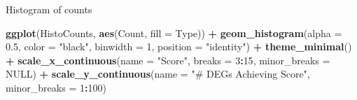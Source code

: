 \documentclass[
]{article}
\newenvironment{Shaded}{\begin{snugshade}}{\end{snugshade}}
\newcommand{\CommentTok}[1]{\textcolor[rgb]{0.56,0.35,0.01}{\textit{#1}}}
\newcommand{\DataTypeTok}[1]{\textcolor[rgb]{0.13,0.29,0.53}{#1}}
\newcommand{\DecValTok}[1]{\textcolor[rgb]{0.00,0.00,0.81}{#1}}
\newcommand{\FloatTok}[1]{\textcolor[rgb]{0.00,0.00,0.81}{#1}}
\newcommand{\KeywordTok}[1]{\textcolor[rgb]{0.13,0.29,0.53}{\textbf{#1}}}
\newcommand{\NormalTok}[1]{#1}
\newcommand{\OperatorTok}[1]{\textcolor[rgb]{0.81,0.36,0.00}{\textbf{#1}}}
\newcommand{\OtherTok}[1]{\textcolor[rgb]{0.56,0.35,0.01}{#1}}
\newcommand{\StringTok}[1]{\textcolor[rgb]{0.31,0.60,0.02}{#1}}
\begin{document}
\begin{Shaded}
\end{Shaded}

Histogram of counts

\begin{Shaded}
\begin{Highlighting}[]
\KeywordTok{ggplot}\NormalTok{(HistoCounts, }\KeywordTok{aes}\NormalTok{(Count, }\DataTypeTok{fill =}\NormalTok{ Type)) }\OperatorTok{+}
\StringTok{  }\KeywordTok{geom_histogram}\NormalTok{(}\DataTypeTok{alpha =} \FloatTok{0.5}\NormalTok{, }\DataTypeTok{color =} \StringTok{"black"}\NormalTok{, }\DataTypeTok{binwidth =} \DecValTok{1}\NormalTok{, }\DataTypeTok{position =} \StringTok{"identity"}\NormalTok{) }\OperatorTok{+}
\StringTok{  }\KeywordTok{theme_minimal}\NormalTok{() }\OperatorTok{+}
\StringTok{  }\KeywordTok{scale_x_continuous}\NormalTok{(}\DataTypeTok{name =} \StringTok{"Score"}\NormalTok{, }\DataTypeTok{breaks =} \DecValTok{3}\OperatorTok{:}\DecValTok{15}\NormalTok{, }\DataTypeTok{minor_breaks =} \OtherTok{NULL}\NormalTok{) }\OperatorTok{+}
\StringTok{  }\KeywordTok{scale_y_continuous}\NormalTok{(}\DataTypeTok{name =} \StringTok{"# DEGs Achieving Score"}\NormalTok{, }\DataTypeTok{minor_breaks =} \DecValTok{1}\OperatorTok{:}\DecValTok{100}\NormalTok{)}
\end{Highlighting}
\end{Shaded}
\end{document}
